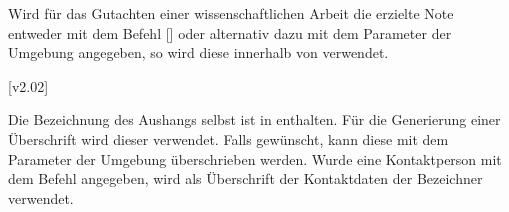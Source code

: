 \begin{DeclareEntity}{}
\begin{Declaration}
Wird für das Gutachten einer wissenschaftlichen Arbeit die erzielte Note 
entweder mit dem Befehl [] oder alternativ dazu 
mit dem Parameter  der 
Umgebung  angegeben, so wird diese innerhalb von 
 verwendet.
\end{Declaration}

\begin{Declaration}
  {}
\begin{Declaration}
  {}
  [v2.02]
\printdeclarationlist

Die Bezeichnung des Aushangs selbst ist in  enthalten. Für 
die Generierung einer Überschrift wird dieser verwendet. Falls gewünscht, kann 
diese mit dem Parameter  der Umgebung 
 überschrieben werden. Wurde eine Kontaktperson mit dem 
Befehl  angegeben, wird als Überschrift der Kontaktdaten 
der Bezeichner  verwendet.

\end{Declaration}
\end{Declaration}
%
\end{DeclareEntity}
